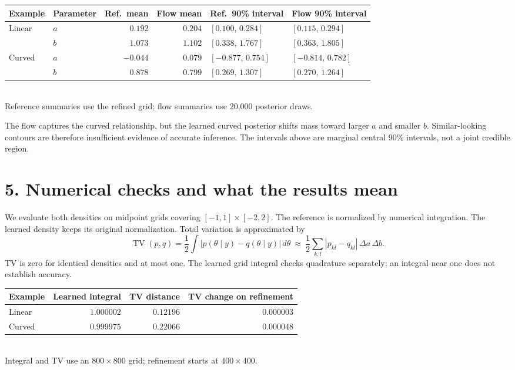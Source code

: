 \documentclass[11pt,a4paper]{article}
\begin{document}
\begin{center}
\small
\begin{tabular}{@{}llrrll@{}}
\toprule
Example & Parameter & Ref.\ mean & Flow mean & Ref.\ 90\% interval & Flow 90\% interval\\
\midrule
Linear & $a$ & $0.192$ & $0.204$ & $[0.100,\,0.284]$ & $[0.115,\,0.294]$\\
       & $b$ & $1.073$ & $1.102$ & $[0.338,\,1.767]$ & $[0.363,\,1.805]$\\
Curved & $a$ & $-0.044$ & $0.079$ & $[-0.877,\,0.754]$ & $[-0.814,\,0.782]$\\
       & $b$ & $0.878$ & $0.799$ & $[0.269,\,1.307]$ & $[0.270,\,1.264]$\\
\bottomrule
\end{tabular}\\[3pt]
{\small Reference summaries use the refined grid; flow summaries use 20,000 posterior draws.}
\end{center}

The flow captures the curved relationship, but the learned curved posterior
shifts mass toward larger $a$ and smaller $b$. Similar-looking contours are
therefore insufficient evidence of accurate inference. The intervals above
are marginal central 90\% intervals, not a joint credible region.

\newpage
\section*{5. Numerical checks and what the results mean}
We evaluate both densities on midpoint grids covering $[-1,1]\times[-2,2]$.
The reference is normalized by numerical integration. The learned density
keeps its original normalization. Total variation is approximated by
\[
 \operatorname{TV}(p,q)=\frac12\int|p(\theta\mid y)-q(\theta\mid y)|\,d\theta
 \ \approx\ \frac12\sum_{k,l}|p_{kl}-q_{kl}|\,\Delta a\,\Delta b.
\]
TV is zero for identical densities and at most one. The learned grid integral
checks quadrature separately; an integral near one does not establish accuracy.

\begin{center}
\begin{tabular}{@{}lrrr@{}}
\toprule
Example & Learned integral & TV distance & TV change on refinement\\
\midrule
Linear & $1.000002$ & $0.12196$ & $0.000003$\\
Curved & $0.999975$ & $0.22066$ & $0.000048$\\
\bottomrule
\end{tabular}\\[3pt]
{\small Integral and TV use an $800\times800$ grid; refinement starts at $400\times400$.}
\end{center}
\end{document}
